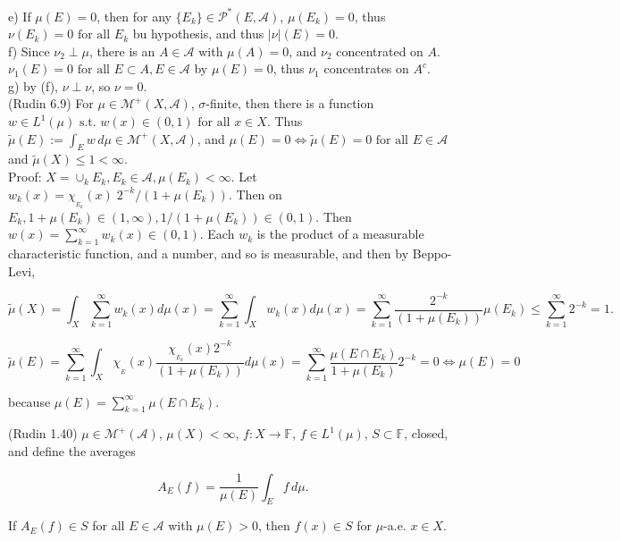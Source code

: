 \documentclass[12pt]{article}
\newcommand{\partset}[1]{ \mathcal{P}^{*}(#1) }
\newcommand{\st}[0]{ \textrm{ s.t. } }
\newcommand{\fall}[0] { \textrm{ for all } }
\newcommand{\lrimply}[0] { \Leftrightarrow }
\newcommand{\rarw}[0] { \rightarrow }
\newcommand{\scalars}[0] { \mathbb{F}}
\newcommand{\A}[0] { \mathcal{A} }
\newcommand{\M}[0] { \mathcal{M} }
\begin{document}
\noindent
e) If $\mu(E) = 0$, then for any $\{ E_k \} \in \partset{E, \A}$, $\mu(E_k) = 0$, thus $\nu(E_k) = 0 \fall E_k$ bu hypothesis, and thus $|\nu|(E) = 0$.   \\

\noindent
f) Since $\nu_2 \perp \mu$, there is an $A \in \A$ with $\mu(A) = 0$, and $\nu_2$ concentrated on $A$. $\nu_1(E) = 0 \fall E \subset A, E \in \A$ by $\mu(E) = 0$, thus $\nu_1$ concentrates on $A^c$.  \\

\noindent
g) by (f), $\nu \perp \nu$, so $\nu = 0$.  \\


(Rudin 6.9) For $\mu \in \M^+(X, \A)$, $\sigma$-finite, then there is a function $w \in L^1(\mu) \st w(x) \in (0,1) \fall x \in X$. Thus $\tilde{\mu}(E) := \int_E w \, d\mu \in \M^+(X, \A)$, and $\mu(E) = 0 \lrimply \tilde{\mu}(E)=0 \fall E \in \A$   and $ \tilde{\mu}(X) \le 1 < \infty$. \\

\noindent
Proof: $X = \cup_k E_k, E_k \in \A, \mu(E_k) < \infty$. Let $w_k(x) = \chi_{_{E_k}}(x) \; 2^{-k}/ (1+\mu(E_k))$. Then on $E_k, 1+\mu(E_k) \in (1,\infty), 1/ (1+\mu(E_k)) \in (0,1)$. Then $w(x) = \sum_{k=1}^\infty w_k(x) \in (0,1)$. Each $w_k$ is the product of a measurable characteristic function, and a number, and so is measurable, and then by Beppo-Levi,

$$
    \tilde{\mu}(X) =  \int_X \sum_{k=1}^\infty w_k(x) d\mu(x) =  \sum_{k=1}^\infty  \int_X w_k(x) d\mu(x) =  \sum_{k=1}^\infty   \frac{2^{-k}}{ (1+\mu(E_k))}     \mu(E_k) \le \sum_{k=1}^\infty 2^{-k} = 1.
$$

$$
    \tilde{\mu}(E) =  \sum_{k=1}^\infty  \int_X \chi_{_{E}}(x) \frac{ \chi_{_{E_k}}(x)  2^{-k}}{ (1+\mu(E_k))} d\mu(x) = \sum_{k=1}^\infty \frac{ \mu(E \cap E_k ) }{ 1+\mu(E_k)} 2^{-k} = 0 \lrimply \mu(E) = 0
$$

\noindent
because $\mu(E) = \sum_{k=1}^\infty \mu(E \cap E_k)$.


\vspace{20pt}

(Rudin 1.40) $\mu \in \M^+(\A)$, $\mu(X) < \infty$, $f: X \rarw \scalars$, $f \in L^1(\mu)$, $S \subset \scalars$, closed, and define the averages

$$
A_E(f) = \frac{1}{\mu(E)}  \int_E f \, d\mu.
$$

\noindent
If $A_E(f) \in S$ for all $E \in \A$ with $\mu(E) > 0$, then $f(x) \in S$ for $\mu$-a.e. $x \in X$. \\
\end{document}
